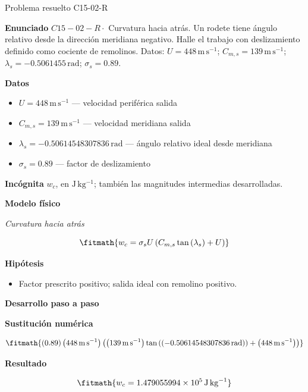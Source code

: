 \documentclass[10pt,openany]{book}
\begin{document}
\begin{studiumworked}{Problema resuelto C15-02-R}


\noindent\textbf{Enunciado}
\(C15-02-R \cdot\) Curvatura hacia atrás. Un rodete tiene ángulo relativo desde la dirección meridiana negativo. Halle el trabajo con deslizamiento definido como cociente de remolinos. Datos: \(U=448\, \mathrm{m}\,\mathrm{s}^{-1}\); \(C_{m,s}=139\, \mathrm{m}\,\mathrm{s}^{-1}\); \(\lambda_s=-0.5061455\, \mathrm{rad}\); \(\sigma_s=0.89\).

\noindent\textbf{Datos}
\begin{itemize}
\item $U = 448\,\mathrm{m}\,\mathrm{s}^{-1}$ — velocidad periférica salida
\item $C_{m,s} = 139\,\mathrm{m}\,\mathrm{s}^{-1}$ — velocidad meridiana salida
\item $\lambda_s = -0.50614548307836\,\mathrm{rad}$ — ángulo relativo ideal desde meridiana
\item $\sigma_s = 0.89$ — factor de deslizamiento
\end{itemize}

\noindent\textbf{Incógnita}
$w_c$, en $\mathrm{J\,kg^{-1}}$; también las magnitudes intermedias desarrolladas.

\noindent\textbf{Modelo físico}

\noindent\textit{Curvatura hacia atrás}

\[
\fitmath{w_c=\sigma_s U \left(C_{m,s} \tan{\left(\lambda_s \right)} + U\right)}
\]

\noindent\textbf{Hipótesis}
\begin{itemize}
\item Factor prescrito positivo; salida ideal con remolino positivo.
\end{itemize}

\noindent\textbf{Desarrollo paso a paso}



\noindent\textbf{Sustitución numérica}

\[
\fitmath{\left(0.89\right) \left(448\,\mathrm{m}\,\mathrm{s}^{-1}\right) \left(\left(139\,\mathrm{m}\,\mathrm{s}^{-1}\right) \tan{\left(\left(-0.50614548307836\,\mathrm{rad}\right) \right)} + \left(448\,\mathrm{m}\,\mathrm{s}^{-1}\right)\right)}
\]

\noindent\textbf{Resultado}

\[
\fitmath{w_c=1.479055994\times10^{5}\,\mathrm{J}\,\mathrm{kg}^{-1}}
\]


\end{studiumworked}
\end{document}
